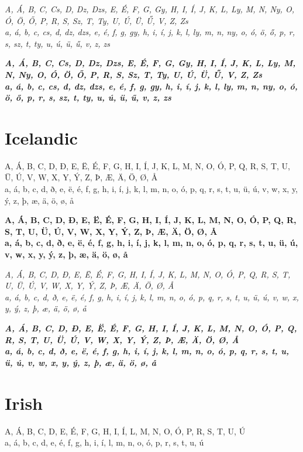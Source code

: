 \documentclass[12pt]{article}
\begin{document}
\textit{
A, Á, B, C, Cs, D, Dz, Dzs, E, É, F, G, Gy, H, I, Í, J, K, L, Ly, M, N,
Ny, O, Ó, Ö, Ő, P, R, S, Sz, T, Ty, U, Ú, Ü, Ű, V, Z, Zs\\
a, á, b, c, cs, d, dz, dzs, e, é, f, g, gy, h, i, í, j, k, l, ly, m, n,
ny, o, ó, ö, ő, p, r, s, sz, t, ty, u, ú, ü, ű, v, z, zs
}

\textbf{\textit{
A, Á, B, C, Cs, D, Dz, Dzs, E, É, F, G, Gy, H, I, Í, J, K, L, Ly, M, N,
Ny, O, Ó, Ö, Ő, P, R, S, Sz, T, Ty, U, Ú, Ü, Ű, V, Z, Zs\\
a, á, b, c, cs, d, dz, dzs, e, é, f, g, gy, h, i, í, j, k, l, ly, m, n,
ny, o, ó, ö, ő, p, r, s, sz, t, ty, u, ú, ü, ű, v, z, zs
}}


\section{Icelandic}
A, Á, B, C, D, Ð, E, Ë, É, F, G, H, I, Í, J, K, L, M, N, O, Ó, P, Q, R, S, T, U, Ü, Ú, V, W, X, Y, Ý, Z, Þ, Æ, Ä, Ö, Ø, Å \\
a, á, b, c, d, ð, e, ë, é, f, g, h, i, í, j, k, l, m, n, o, ó, p, q, r, s, t, u, ü, ú, v, w, x, y, ý, z, þ, æ, ä, ö, ø, å

\textbf{
A, Á, B, C, D, Ð, E, Ë, É, F, G, H, I, Í, J, K, L, M, N, O, Ó, P, Q, R, S, T, U, Ü, Ú, V, W, X, Y, Ý, Z, Þ, Æ, Ä, Ö, Ø, Å \\
a, á, b, c, d, ð, e, ë, é, f, g, h, i, í, j, k, l, m, n, o, ó, p, q, r, s, t, u, ü, ú, v, w, x, y, ý, z, þ, æ, ä, ö, ø, å
}

\textit{
A, Á, B, C, D, Ð, E, Ë, É, F, G, H, I, Í, J, K, L, M, N, O, Ó, P, Q, R, S, T, U, Ü, Ú, V, W, X, Y, Ý, Z, Þ, Æ, Ä, Ö, Ø, Å \\
a, á, b, c, d, ð, e, ë, é, f, g, h, i, í, j, k, l, m, n, o, ó, p, q, r, s, t, u, ü, ú, v, w, x, y, ý, z, þ, æ, ä, ö, ø, å
}

\textbf{\textit{
A, Á, B, C, D, Ð, E, Ë, É, F, G, H, I, Í, J, K, L, M, N, O, Ó, P, Q, R, S, T, U, Ü, Ú, V, W, X, Y, Ý, Z, Þ, Æ, Ä, Ö, Ø, Å \\
a, á, b, c, d, ð, e, ë, é, f, g, h, i, í, j, k, l, m, n, o, ó, p, q, r, s, t, u, ü, ú, v, w, x, y, ý, z, þ, æ, ä, ö, ø, å
}}


\clearpage
\section{Irish}
A, Á, B, C, D, E, É, F, G, H, I, Í, L, M, N, O, Ó, P, R, S, T, U, Ú \\
a, á, b, c, d, e, é, f, g, h, i, í, l, m, n, o, ó, p, r, s, t, u, ú
\end{document}
